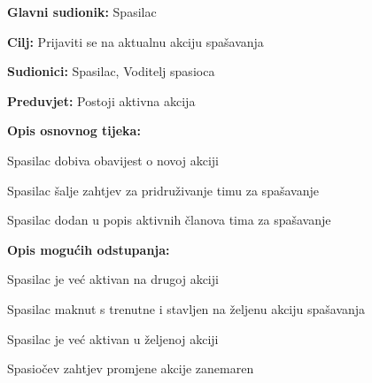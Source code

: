     		\begin{packed_item}
    			
    			\item \textbf{Glavni sudionik: }Spasilac
    			\item  \textbf{Cilj:} Prijaviti se na aktualnu akciju spašavanja
    			\item  \textbf{Sudionici:} Spasilac, Voditelj spasioca
    			\item  \textbf{Preduvjet:} Postoji aktivna akcija
    			\item  \textbf{Opis osnovnog tijeka:}
    			
    			\item[] \begin{packed_enum}
    				
    				\item Spasilac dobiva obavijest o novoj akciji
    				\item Spasilac šalje zahtjev za pridruživanje timu za spašavanje
    				\item Spasilac dodan u popis aktivnih članova tima za spašavanje

    			\end{packed_enum}
    			
    			\item  \textbf{Opis mogućih odstupanja:}
    			
    			\item[] \begin{packed_item}
    				
    				\item[2.a] Spasilac je već aktivan na drugoj akciji
    				\item[] \begin{packed_enum}
    					
    					\item Spasilac maknut s trenutne i stavljen na željenu akciju spašavanja
    					
    				\end{packed_enum}
    				\item[2.b] Spasilac je već aktivan u željenoj akciji
    				\item[] \begin{packed_enum}
    					
	    					\item Spasiočev zahtjev promjene akcije zanemaren\\
    					
    				\end{packed_enum}	
    			\end{packed_item}
    		\end{packed_item}	
